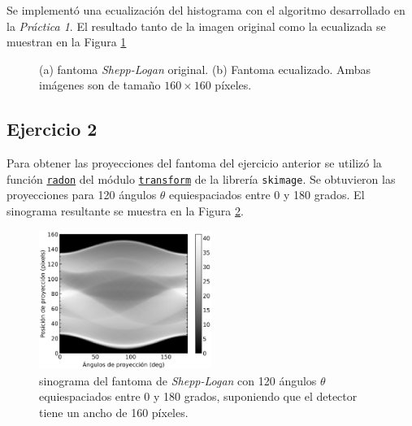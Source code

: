 \documentclass[11pt, twocolumn]{article}
\begin{document}
Se implementó una ecualización del histograma con el algoritmo desarrollado en la \textit{Práctica 1}. El resultado tanto de la imagen original como la ecualizada se muestran en la Figura \ref{fig:figuras_ej_1}

\begin{figure}[H]
    \centering
    \hfill
    \hfill
    \caption{(a) fantoma \textit{Shepp-Logan} original. (b) Fantoma ecualizado. Ambas imágenes son de tamaño $160 \times 160$ píxeles.}
    \label{fig:figuras_ej_1}
  \end{figure}

\subsection*{Ejercicio 2}
Para obtener las proyecciones del fantoma del ejercicio anterior se utilizó la función \href{https://scikit-image.org/docs/stable/api/skimage.transform.html#skimage.transform.radon}{\texttt{radon}} del módulo \href{https://scikit-image.org/docs/stable/api/skimage.transform.html#}{\texttt{transform}} de la librería \texttt{skimage}. Se obtuvieron las proyecciones para 120 ángulos $\theta$ equiespaciados entre 0 y 180 grados. El sinograma resultante se muestra en la Figura \ref{fig:sinograma_ej_2}.

\begin{figure} [htbp]
    \centering
    \includegraphics[width=0.5\textwidth]{images/ej_2/sinogram.png}
    \caption{sinograma del fantoma de \textit{Shepp-Logan} con 120 ángulos $\theta$ equiespaciados entre 0 y 180 grados, suponiendo que el detector tiene un ancho de 160 píxeles.}
    \label{fig:sinograma_ej_2}
\end{figure}
\end{document}
